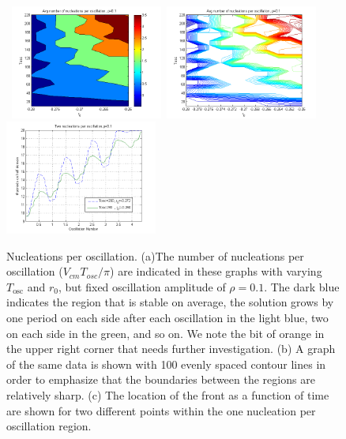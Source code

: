 \documentclass[pre,preprint,superscriptaddress]{revtex4-1}
\begin{document}
\begin{figure}[!htb]
\begin{center}
    \mbox{
\includegraphics[width=50mm]{NucPerOsc.png}
\includegraphics[width=50mm]{NucPerOscCont.png}
\includegraphics[width=50mm]{NucPerOsc2time.png}
}
\caption{Nucleations per oscillation. (a)The number of nucleations per oscillation ($V_{cm} T_{osc}/\pi$)  are indicated in these graphs with varying $T_{\text{osc}}$ and $r_0$, but fixed oscillation amplitude of $\rho=0.1$.  The dark blue indicates the region that is stable on average, the solution grows by one period on each side after each oscillation in the light blue, two on each side in the green, and so on.  We note the bit of orange in the upper right corner that needs further investigation.  (b) A graph of the same data is shown with 100 evenly spaced contour lines in order to emphasize that the boundaries between the regions are relatively sharp.  (c) The location of the front as a function of time are shown for two different points within the one nucleation per oscillation region. }
\label{fig:holes}
\end{center}
\end{figure}
\end{document}
